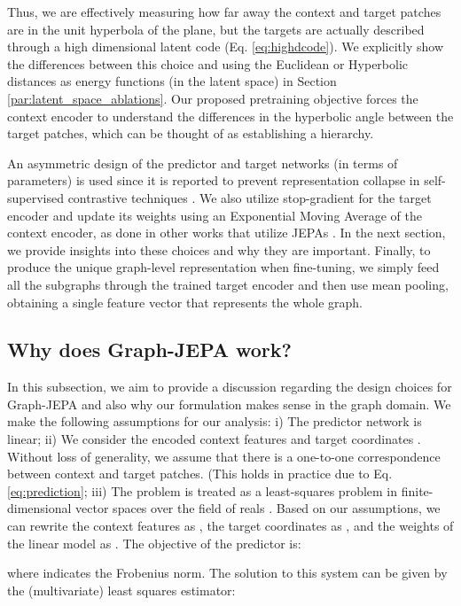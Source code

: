 \documentclass{article} \usepackage{iclr2024_conference,times}
\begin{document}
Thus, we are effectively measuring how far away the context and target patches are in the unit hyperbola of the plane, but the targets are actually described through a high dimensional latent code (Eq. \ref{eq:highdcode}). We explicitly show the differences between this choice and using the Euclidean or Hyperbolic distances as energy functions (in the latent space) in Section \ref{par:latent_space_ablations}. Our proposed pretraining objective forces the context encoder to understand the differences in the hyperbolic angle between the target patches, which can be thought of as establishing a hierarchy. 

An asymmetric design of the predictor and target networks (in terms of parameters) is used since it is reported to prevent representation collapse in self-supervised contrastive techniques \citep{chen2020simple, baevski2022data2vec}. We also utilize stop-gradient for the target encoder and update its weights using an Exponential Moving Average of the context encoder, as done in other works that utilize JEPAs \citep{assran2023self,grill2020bootstrap,chen2021exploring}. In the next section, we provide insights into these choices and why they are important. Finally, to produce the unique graph-level representation when fine-tuning, we simply feed all the subgraphs through the trained target encoder and then use mean pooling, obtaining a single feature vector  that represents the whole graph.

\subsection{Why does Graph-JEPA work?} \label{met:formal_discussion}
In this subsection, we aim to provide a discussion regarding the design choices for Graph-JEPA and also why our formulation makes sense in the graph domain. We make the following assumptions for our analysis: i) The predictor network is linear; ii) We consider the encoded context features  and target coordinates . Without loss of generality, we assume that there is a one-to-one correspondence between context and target patches. (This holds in practice due to Eq. \ref{eq:prediction}; iii) The problem is treated as a least-squares problem in finite-dimensional vector spaces over the field of reals . Based on our assumptions, we can rewrite the context features as , the target coordinates as , and the weights of the linear model as . The objective of the predictor is:
 
where  indicates the Frobenius norm. The solution to this system can be given by the (multivariate) least squares estimator:
\end{document}
